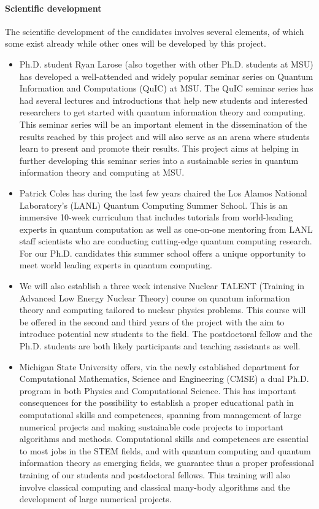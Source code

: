 \documentclass[11pt]{article}
\begin{document}
\paragraph{Scientific development}
The scientific development of the candidates involves several elements, of which some exist already while other ones will be developed by this project. 
\begin{itemize}
    \item Ph.D. student Ryan Larose (also together with other Ph.D. students at MSU) has developed a well-attended and widely popular seminar series on Quantum Information and Computations (QuIC) at MSU. The QuIC seminar series has had  several lectures and introductions that help new students and interested researchers to get started with quantum information theory and computing. This seminar series will be an important element in the dissemination of the results reached by this project and will also serve as an arena where students learn to present and promote their results.  This project aims at helping in further developing this seminar series into a sustainable series in quantum information theory and computing at MSU. 
    \item Patrick Coles has during the last few years chaired the Los Alamos National Laboratory's (LANL) Quantum Computing Summer School. This is an immersive 10-week curriculum that includes tutorials from world-leading experts in quantum computation as well as one-on-one mentoring from LANL staff scientists who are conducting cutting-edge quantum computing research. For our Ph.D. candidates this summer school offers a unique opportunity to meet world leading experts in quantum computing. 
    \item We will also establish a three week intensive Nuclear TALENT (Training in Advanced Low Energy Nuclear Theory) course on quantum information theory and computing tailored to nuclear physics problems. This course will be offered in the second and third years of the project with the aim to introduce potential new students to the field. The postdoctoral fellow and the Ph.D. students are both likely participants and teaching assistants as well.
    \item Michigan State University offers, via the newly established department for Computational Mathematics, Science and Engineering (CMSE) a dual Ph.D. program in both Physics and Computational Science. This has important consequences for the possibility to establish a proper educational path in computational skills and competences, spanning from management of large numerical projects and making sustainable code projects to important algorithms and methods. Computational skills and competences are essential to most jobs in the STEM fields, and with quantum computing and quantum information theory as emerging fields, we guarantee thus a proper professional training of our students and postdoctoral fellows. This training will also involve classical computing and classical many-body algorithms and the development of large numerical projects.  

\end{itemize}
\end{document}
